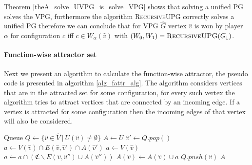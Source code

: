 Theorem \ref{theA_solve_UVPG_is_solve_VPG} shows that solving a unified PG solves the VPG, furthermore the algorithm \textsc{RecursiveUPG} correctly solves a unified PG therefore we can conclude that for VPG $\hat{G}$ vertex $\hat{v}$ is won by player $\alpha$ for configuration $c$ iff $c \in W_\alpha(\hat{v})$ with $(W_0,W_1) = \textsc{RecursiveUPG}(G_{\downarrow})$.

\paragraph{Function-wise attractor set}
Next we present an algorithm to calculate the function-wise attractor, the pseudo code is presented in algorithm \ref{alg_fattr_alg}. The algorithm considers vertices that are in the attracted set for some configuration, for every such vertex the algorithm tries to attract vertices that are connected by an incoming edge. If a vertex is attracted for some configuration then the incoming edges of that vertex will also be considered.
\begin{algorithm}
	\caption{$\textsc{$\alpha$-FAttractor}(G, U : \hat{V} \rightarrow 2^\mathfrak{C})$}\label{alg_fattr_alg}
	\begin{algorithmic}[1]
		\State Queue $Q \gets \{\hat{v} \in \hat{V} \ |\ U(\hat{v}) \neq \emptyset  \}$
		\State $A \gets U$
		\State $\hat{v}' \gets Q.pop()$
				\State $a \gets V(\hat{v}) \cap E(\hat{v},\hat{v}') \cap A(\hat{v}')$
			\Else
				\State $a \gets V(\hat{v})$
					\State $a \gets a \cap (\mathfrak{C}\backslash E(\hat{v},\hat{v}'') \cup A(\hat{v}''))$
				\EndFor
			\EndIf
				\State $A(\hat{v}) \gets A(\hat{v}) \cup a$
				\State $Q.push(\hat{v})$
			\EndIf
		\EndFor
		\EndWhile
		\State \Return $A$
	\end{algorithmic}
\end{algorithm}

